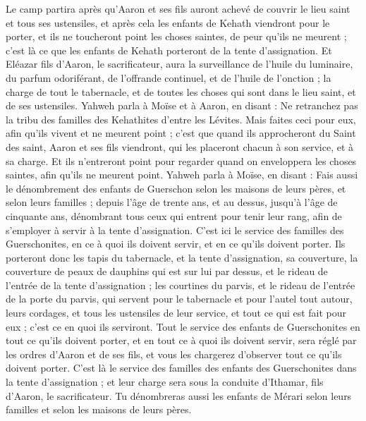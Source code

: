 \begin{multicols}{2}
Le camp partira après qu'Aaron et ses fils auront achevé de couvrir le lieu saint et tous ses ustensiles, et après cela les enfants de Kehath viendront pour le porter, et ils ne toucheront point les choses saintes, de peur qu'ils ne meurent ; c'est là ce que les enfants de Kehath porteront de la tente d'assignation.
Et Eléazar fils d'Aaron, le sacrificateur, aura la surveillance de l'huile du luminaire, du parfum odoriférant, de l'offrande continuel, et de l'huile de l'onction ; la charge de tout le tabernacle, et de toutes les choses qui sont dans le lieu saint, et de ses ustensiles.
Yahweh parla à Moïse et à Aaron, en disant :
Ne retranchez pas la tribu des familles des Kehathites d'entre les Lévites.
Mais faites ceci pour eux, afin qu'ils vivent et ne meurent point ; c'est que quand ils approcheront du Saint des saint, Aaron et ses fils viendront, qui les placeront chacun à son service, et à sa charge.
Et ils n'entreront point pour regarder quand on enveloppera les choses saintes, afin qu'ils ne meurent point.
Yahweh parla à Moïse, en disant :
Fais aussi le dénombrement des enfants de Guerschon selon les maisons de leurs pères, et selon leurs familles ;
depuis l'âge de trente ans, et au dessus, jusqu'à l'âge de cinquante ans, dénombrant tous ceux qui entrent pour tenir leur rang, afin de s'employer à servir à la tente d'assignation.
C'est ici le service des familles des Guerschonites, en ce à quoi ils doivent servir, et en ce qu'ils doivent porter.
Ils porteront donc les tapis du tabernacle, et la tente d'assignation, sa couverture, la couverture de peaux de dauphins qui est sur lui par dessus, et le rideau de l'entrée de la tente d'assignation ;
les courtines du parvis, et le rideau de l'entrée de la porte du parvis, qui servent pour le tabernacle et pour l'autel tout autour, leurs cordages, et tous les ustensiles de leur service, et tout ce qui est fait pour eux ; c'est ce en quoi ils serviront.
Tout le service des enfants de Guerschonites en tout ce qu'ils doivent porter, et en tout ce à quoi ils doivent servir, sera réglé par les ordres d'Aaron et de ses fils, et vous les chargerez d'observer tout ce qu'ils doivent porter.
C'est là le service des familles des enfants des Guerschonites dans la tente d'assignation ; et leur charge sera sous la conduite d'Ithamar, fils d'Aaron, le sacrificateur.
Tu dénombreras aussi les enfants de Mérari selon leurs familles et selon les maisons de leurs pères.

\end{multicols}
